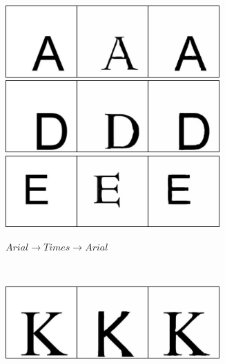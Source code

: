 \documentclass[10pt,twocolumn,letterpaper]{article}
\begin{document}
\begin{figure}[!htb]
     \centering
     \begin{subfigure}[]{0.49\textwidth}
         \centering
         \includegraphics[width=0.9\textwidth]{test_a_2_b_4}\\
         \vspace{0.3cm}
		 \includegraphics[width=0.9\textwidth]{test_a_2_b_32(1)}\\
		 \vspace{0.3cm}
		 \includegraphics[width=0.9\textwidth]{test_a_2_b_40}\\
		 \caption{$Arial \rightarrow Times \rightarrow Arial$}
         \label{fig:arial2times}
     \end{subfigure}
     ~
     \begin{subfigure}[]{0.49\textwidth}
         \centering
         \includegraphics[width=0.9\textwidth]{test_b_2_a_94}\\

\end{subfigure}
\end{figure}
\end{document}

